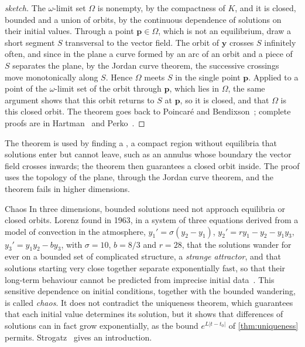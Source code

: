 \begin{proof}[sketch]
The $\omega$-limit set $\Omega$ is nonempty, by the compactness of $K$, and it is closed, bounded and a union of orbits, by the continuous dependence of solutions on their initial values. Through a point $\mathbf p\in\Omega$, which is not an equilibrium, draw a short segment $S$ transversal to the vector field. The orbit of $\mathbf y$ crosses $S$ infinitely often, and since in the plane a curve formed by an arc of an orbit and a piece of $S$ separates the plane, by the Jordan curve theorem, the successive crossings move monotonically along $S$. Hence $\Omega$ meets $S$ in the single point $\mathbf p$. Applied to a point of the $\omega$-limit set of the orbit through $\mathbf p$, which lies in $\Omega$, the same argument shows that this orbit returns to $S$ at $\mathbf p$, so it is closed, and that $\Omega$ is this closed orbit. The theorem goes back to Poincar\'e and Bendixson~\cite{poincare1881,bendixson1901}; complete proofs are in Hartman~\cite[Chap.~VII]{hartman2002} and Perko~\cite[Chap.~3]{perko2001}.
\end{proof}

The theorem is used by finding a , a compact region without equilibria that solutions enter but cannot leave, such as an annulus whose boundary the vector field crosses inwards; the theorem then guarantees a closed orbit inside. The proof uses the topology of the plane, through the Jordan curve theorem, and the theorem fails in higher dimensions.

\begin{note}{Chaos}
In three dimensions, bounded solutions need not approach equilibria or closed orbits. Lorenz found in 1963, in a system of three equations derived from a model of convection in the atmosphere, $y_1'=\sigma(y_2-y_1)$, $y_2'=ry_1-y_2-y_1y_3$, $y_3'=y_1y_2-by_3$, with $\sigma=10$, $b=8/3$ and $r=28$, that the solutions wander for ever on a bounded set of complicated structure, a \emph{strange attractor}, and that solutions starting very close together separate exponentially fast, so that their long-term behaviour cannot be predicted from imprecise initial data~\cite{lorenz1963}. This sensitive dependence on initial conditions, together with the bounded wandering, is called \emph{chaos}. It does not contradict the uniqueness theorem, which guarantees that each initial value determines its solution, but it shows that differences of solutions can in fact grow exponentially, as the bound $e^{L|t-t_0|}$ of \cref{thm:uniqueness} permits. Strogatz~\cite[Chap.~9]{strogatz2015} gives an introduction.
\end{note}

